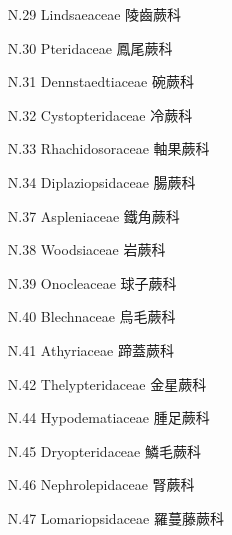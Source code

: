 \begin{enumerate}
    \begin{enumerate}
      \item[N.29] Lindsaeaceae 陵齒蕨科      
        
      \item[N.30] Pteridaceae 鳳尾蕨科      
        
      \item[N.31] Dennstaedtiaceae 碗蕨科      
        
      \item[N.32] Cystopteridaceae 冷蕨科      
        
      \item[N.33] Rhachidosoraceae 軸果蕨科      
        
      \item[N.34] Diplaziopsidaceae 腸蕨科      
        
      \item[N.37] Aspleniaceae 鐵角蕨科      
        
      \item[N.38] Woodsiaceae 岩蕨科      
        
      \item[N.39] Onocleaceae 球子蕨科      
        
      \item[N.40] Blechnaceae 烏毛蕨科      
        
      \item[N.41] Athyriaceae 蹄蓋蕨科      
        
      \item[N.42] Thelypteridaceae 金星蕨科      
        
      \item[N.44] Hypodematiaceae 腫足蕨科      
        
      \item[N.45] Dryopteridaceae 鱗毛蕨科      
        
      \item[N.46] Nephrolepidaceae 腎蕨科      
        
      \item[N.47] Lomariopsidaceae 羅蔓藤蕨科      

\end{enumerate}
\end{enumerate}
